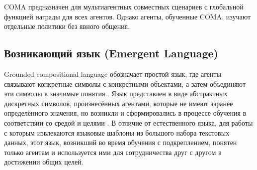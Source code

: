 COMA предназначен для мультиагентных совместных сценариев с глобальной функцией награды для всех агентов. Однако агенты, обученные COMA, изучают отдельные политики без явного общения. \cite{foerster2017counterfactual}

\subsection{Возникающий язык (Emergent Language)}

Grounded compositional language обозначает простой язык, где агенты связывают конкретные символы с конкретными объектами, а затем объединяют эти символы в значимые понятия \cite{Szabo2008-SZAC}. Язык представлен в виде абстрактных дискретных символов, произнесённых агентами, которые не имеют заранее определённого значения, но возникли и сформировались в процессе обучения в соответствии со средой и целями \cite{mordatch2017emergence}. В отличие от естественного языка, для работы с которым извлекаются языковые шаблоны из большого набора текстовых данных, этот язык, возникший во время обучения с подкреплением, понятен только агентам и используется ими для сотрудничества друг с другом в достижении общих целей.
